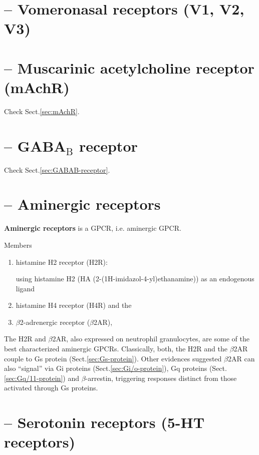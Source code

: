  \section{ -- Vomeronasal receptors (V1, V2, V3)}
 \label{sec:Vomeronasal-receptor}

\section{ -- Muscarinic acetylcholine receptor (mAchR)}

Check Sect.\ref{sec:mAchR}.

\section[ -- GABA-B receptor]{ -- GABA$_\text{B}$ receptor}

Check Sect.\ref{sec:GABAB-receptor}.

\section{ -- Aminergic receptors}
\label{sec:aminergic-receptors}

{\bf Aminergic receptors} is a GPCR, i.e. aminergic GPCR. 

Members \citep{brunskole2011}
\begin{enumerate}
  \item histamine H2 receptor (H2R): 
  
  using histamine H2 (HA (2-(1H-imidazol-4-yl)ethanamine)) as an endogenous
  ligand
  
  \item histamine H4 receptor (H4R) and the 
  
  \item $\beta$2-adrenergic receptor ($\beta$2AR), 
\end{enumerate}
The H2R and $\beta$2AR, also expressed on neutrophil granulocytes, are some of
the best characterized aminergic GPCRs.
Classically, both, the H2R and the $\beta$2AR couple to Gs protein
(Sect.\ref{sec:Gs-protein}). Other evidences suggested
$\beta$2AR can also ``signal'' via Gi proteins (Sect.\ref{sec:Gi/o-protein}), Gq
proteins (Sect.\ref{sec:Gq/11-protein}) and $\beta$-arrestin, triggering
responses distinct from those activated through Gs proteins.


\section{ -- Serotonin receptors (5-HT receptors)}
\label{sec:serotonin-receptors}
\label{sec:5-HT_receptor}

